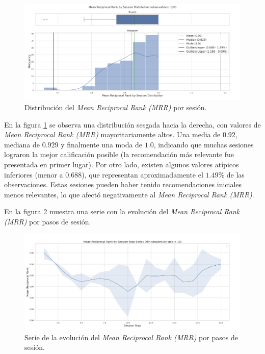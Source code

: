 \documentclass[11pt,a4paper,twoside]{thesis}
\begin{document}
\begin{figure}[htbp]
	\centering
	\includegraphics[width=15cm]{./images/llama2/mean_reciprocal_rank_by_session_distribution.png}
	\caption{Distribución del \textit{Mean Reciprocal Rank (MRR)} por sesión.}
	\label{fig:llama2-mean_reciprocal_rank_by_session_distribution}
\end{figure}

En la figura \ref{fig:llama2-mean_reciprocal_rank_by_session_distribution} se observa una distribución sesgada hacia la derecha, con valores de \textit{Mean Reciprocal Rank (MRR)} mayoritariamente altos. Una media de $0.92$, mediana de $0.929$ y finalmente una moda de $1.0$, indicando que muchas sesiones lograron la mejor calificación posible (la recomendación más relevante fue presentada en primer lugar). Por otro lado, existen algunos valores atípicos inferiores (menor a $0.688$), que representan aproximadamente el $1.49\%$ de las observaciones. Estas sesiones pueden haber tenido recomendaciones iniciales menos relevantes, lo que afectó negativamente al \textit{Mean Reciprocal Rank (MRR)}.

\clearpage

En la figura \ref{fig:llama2-mean_reciprocal_rank_by_session_step_series} muestra una serie con la evolución del \textit{Mean Reciprocal Rank (MRR)} por pasos de sesión.

\begin{figure}[htbp]
	\centering
	\includegraphics[width=15cm]{./images/llama2/mean_reciprocal_rank_by_session_step_series.png}
	\caption{Serie de la evolución del \textit{Mean Reciprocal Rank (MRR)} por pasos de sesión.}
	\label{fig:llama2-mean_reciprocal_rank_by_session_step_series}
\end{figure}
\end{document}
